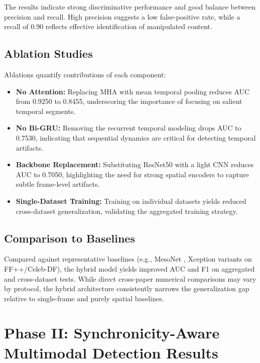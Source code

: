 The results indicate strong discriminative performance and good balance between precision and recall. High precision suggests a low false-positive rate, while a recall of 0.90 reflects effective identification of manipulated content.

\subsection{Ablation Studies}
Ablations quantify contributions of each component:
\begin{itemize}
    \item \textbf{No Attention:} Replacing MHA with mean temporal pooling reduces AUC from 0.9250 to 0.8455, underscoring the importance of focusing on salient temporal segments.
    \item \textbf{No Bi-GRU:} Removing the recurrent temporal modeling drops AUC to 0.7530, indicating that sequential dynamics are critical for detecting temporal artifacts.
    \item \textbf{Backbone Replacement:} Substituting ResNet50 with a light CNN reduces AUC to 0.7050, highlighting the need for strong spatial encoders to capture subtle frame-level artifacts.
    \item \textbf{Single-Dataset Training:} Training on individual datasets yields reduced cross-dataset generalization, validating the aggregated training strategy.
\end{itemize}

\subsection{Comparison to Baselines}
Compared against representative baselines (e.g., MesoNet \cite{afchar2018mesonet}, Xception variants on FF++/Celeb-DF), the hybrid model yields improved AUC and F1 on aggregated and cross-dataset tests. While direct cross-paper numerical comparisons may vary by protocol, the hybrid architecture consistently narrows the generalization gap relative to single-frame and purely spatial baselines.

\section{Phase II: Synchronicity-Aware Multimodal Detection Results}
